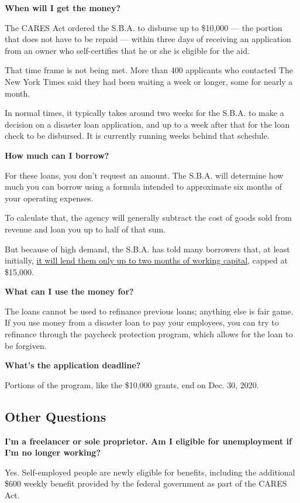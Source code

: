 \textbf{When will I get the money?}

The CARES Act ordered the S.B.A. to disburse up to \$10,000 --- the
portion that does not have to be repaid --- within three days of
receiving an application from an owner who self-certifies that he or she
is eligible for the aid.

That time frame is not being met. More than 400 applicants who contacted
The New York Times said they had been waiting a week or longer, some for
nearly a month.

In normal times, it typically takes around two weeks for the S.B.A. to
make a decision on a disaster loan application, and up to a week after
that for the loan check to be disbursed. It is currently running weeks
behind that schedule.

\textbf{How much can I borrow?}

For these loans, you don't request an amount. The S.B.A. will determine
how much you can borrow using a formula intended to approximate six
months of your operating expenses.

To calculate that, the agency will generally subtract the cost of goods
sold from revenue and loan you up to half of that sum.

But because of high demand, the S.B.A. has told many borrowers that, at
least initially,
\href{https://int.nyt.com/data/documenthelper/6871-sba-note-about-15000-cap/optimized/full.pdf}{it
will lend them only up to two months of working capital}, capped at
\$15,000.

\textbf{What can I use the money for?}

The loans cannot be used to refinance previous loans; anything else is
fair game. If you use money from a disaster loan to pay your employees,
you can try to refinance through the paycheck protection program, which
allows for the loan to be forgiven.

\textbf{What's the application deadline?}

Portions of the program, like the \$10,000 grants, end on Dec. 30, 2020.

\hypertarget{other-questions}{%
\subsection{Other Questions}\label{other-questions}}

\textbf{I'm a freelancer or sole proprietor. Am I eligible for
unemployment if I'm no longer working?}

Yes. Self-employed people are newly eligible for benefits, including the
additional \$600 weekly benefit provided by the federal government as
part of the CARES Act.

